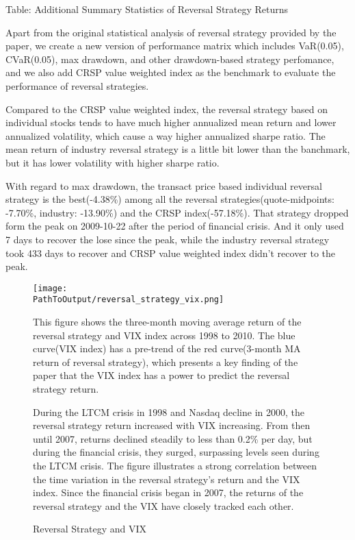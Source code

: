 \documentclass{article}
\newcommand*{\PathToOutput}{../output/}
\begin{document}
\begin{landscape}
\begin{table}
    \centering
    \caption*{Table: Additional Summary Statistics of Reversal Strategy Returns}

    \raggedright
    \small
    Apart from the original statistical analysis of reversal strategy provided by 
    the paper, we create a new version of performance matrix which includes VaR(0.05), 
    CVaR(0.05), max drawdown, and other drawdown-based strategy perfomance, and we also 
    add CRSP value weighted index as the benchmark to evaluate the performance of reversal strategies. 

    Compared to the CRSP value weighted index, the reversal strategy based on individual 
    stocks tends to have much higher annualized mean return and lower annualized volatility, 
    which cause a way higher annualized sharpe ratio. The mean return of industry reversal 
    strategy is a little bit lower than the banchmark, but it has lower volatility 
    with higher sharpe ratio.

    With regard to max drawdown, the transact price based individual reversal strategy 
    is the best(-4.38\%) among all the reversal strategies(quote-midpoints: -7.70\%, 
    industry: -13.90\%) and the CRSP index(-57.18\%). That strategy dropped form the 
    peak on 2009-10-22 after the period of financial crisis. And it only used 7 days to 
    recover the lose since the peak, while the industry reversal strategy took 433 days 
    to recover and CRSP value weighted index didn't recover to the peak.
    \medskip

    \centering
    
\end{table}

\begin{figure}
    \centering
    \texttt{[image: \\PathToOutput/reversal\_strategy\_vix.png]}
    \caption{Reversal Strategy and VIX}

    \raggedright
    \medskip
    \small 
    This figure shows the three-month moving average return of the reversal strategy 
    and VIX index across 1998 to 2010. The blue curve(VIX index) has a pre-trend of 
    the red curve(3-month MA return of reversal strategy), which presents a key finding 
    of the paper that the VIX index has a power to predict the reversal strategy return.

    During the LTCM crisis in 1998 and  Nasdaq decline in 2000, the reversal strategy 
    return increased with VIX increasing. From then until 2007, returns declined steadily
    to less than 0.2\% per day, but during the financial crisis, they surged, surpassing 
    levels seen during the LTCM crisis. The figure illustrates a strong correlation 
    between the time variation in the reversal strategy's return and the VIX index. 
    Since the financial crisis began in 2007, the returns of the reversal strategy 
    and the VIX have closely tracked each other.
\end{figure}

\end{landscape}
\end{document}
